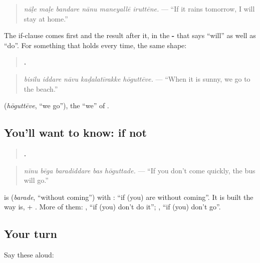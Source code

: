 \begin{quote}
\emph{nāḷe maḷe bandare nānu maneyallē iruttēne.} — \textquotedblleft{}If it rains tomorrow, I will stay at home.\textquotedblright{}
\end{quote}

The if-clause comes first and the result after it, in the \textbf{-} that says \textquotedblleft{}will\textquotedblright{} as well as \textquotedblleft{}do\textquotedblright{}. For something that holds every time, the same shape:

\begin{quote}
\textbf{    .}
\end{quote}

\begin{quote}
\emph{bisilu iddare nāvu kaḍalatīrakke hōguttēve.} — \textquotedblleft{}When it is sunny, we go to the beach.\textquotedblright{}
\end{quote}

\textbf{} (\emph{hōguttēve}, \textquotedblleft{}we go\textquotedblright{}), the \textquotedblleft{}we\textquotedblright{} of \textbf{}.

\subsection*{You'll want to know: if not}
\begin{quote}
\textbf{    .}
\end{quote}

\begin{quote}
\emph{nīnu bēga baradiddare bas hōguttade.} — \textquotedblleft{}If you don't come quickly, the bus will go.\textquotedblright{}
\end{quote}

\textbf{} is \textbf{} (\emph{barade}, \textquotedblleft{}without coming\textquotedblright{}) with \textbf{}: \textquotedblleft{}if (you) are without coming\textquotedblright{}. It is built the way \textbf{} is, \textbf{} + \textbf{}. More of them: \textbf{}, \textquotedblleft{}if (you) don't do it\textquotedblright{}; \textbf{}, \textquotedblleft{}if (you) don't go\textquotedblright{}.

\subsection*{Your turn}
Say these aloud:

